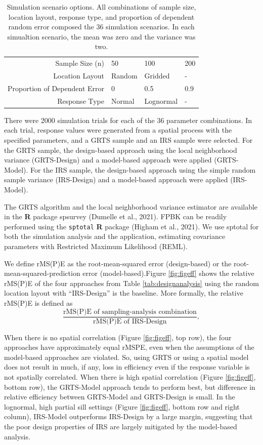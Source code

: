 \documentclass[]{elsarticle} %
\begin{document}
\begin{table}[ht]
\centering
\begin{tabular}{r|lll}
   \hline
Sample Size (n) & 50 & 100 & 200 \\ 
  Location Layout & Random & Gridded & - \\ 
  Proportion of Dependent Error & 0 & 0.5 & 0.9 \\ 
  Response Type & Normal & Lognormal & - \\ 
   \hline
\end{tabular}
\caption{\label{tab:parmtab} Simulation scenario options. All combinations of sample size, location layout, response type, and proportion of dependent random error composed the 36 simulation scenarios. In each simualtion scenario, the mean was zero and the variance was two.} 
\end{table}

There were 2000 simulation trials for each of the 36 parameter
combinations. In each trial, response values were generated from a
spatial process with the specified parameters, and a GRTS sample and an
IRS sample were selected. For the GRTS sample, the design-based approach
using the local neighborhood variance (GRTS-Design) and a model-based
approach were applied (GRTS-Model). For the IRS sample, the design-based
approach using the simple random sample variance (IRS-Design) and a
model-based approach were applied (IRS-Model).

The GRTS algorithm and the local neighborhood variance estimator are
available in the \textbf{\textsf{R}} package spsurvey (Dumelle et al.,
2021). FPBK can be readily performed using the \texttt{sptotal}
\textbf{\textsf{R}} package (Higham et al., 2021). We use sptotal for
both the simulation analysis and the application, estimating covariance
parameters with Restricted Maximum Likelihood (REML).

We define rMS(P)E as the root-mean-squared error (design-based) or the
root-mean-squared-prediction error (model-based).Figure \ref{fig:figeff}
shows the relative rMS(P)E of the four approaches from Table
\ref{tab:designanalysis} using the random location layout with
``IRS-Design'' is the baseline. More formally, the relative rMS(P)E is
defined as \begin{equation*}
\frac{\text{rMS(P)E of sampling-analysis combination}}{\text{rMS(P)E of IRS-Design}},
\end{equation*}

When there is no spatial correlation (Figure \ref{fig:figeff}, top row),
the four approaches have approximately equal rMSPE, even when the
assumptions of the model-based approaches are violated. So, using GRTS
or using a spatial model does not result in much, if any, loss in
efficiency even if the response variable is not spatially correlated.
When there is high spatial correlation (Figure \ref{fig:figeff}, bottom
row), the GRTS-Model approach tends to perform best, but difference in
relative efficiency between GRTS-Model and GRTS-Design is small. In the
lognormal, high partial sill settings (Figure \ref{fig:figeff}, bottom
row and right column), IRS-Model outperforms IRS-Design by a large
margin, suggesting that the poor design properties of IRS are largely
mitigated by the model-based analysis.
\end{document}
